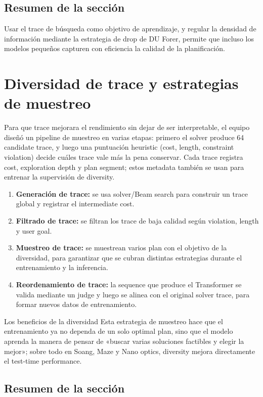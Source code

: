 \documentclass[a4paper]{article}
\begin{document}
\subsection{Resumen de la sección}

Usar el trace de búsqueda como objetivo de aprendizaje, y regular la densidad de información mediante la estrategia de drop de DU Forer, permite que incluso los modelos pequeños capturen con eficiencia la calidad de la planificación.

\section{Diversidad de trace y estrategias de muestreo}

Para que trace mejorara el rendimiento sin dejar de ser interpretable, el equipo diseñó un pipeline de muestreo en varias etapas: primero el solver produce 64 candidate trace, y luego una puntuación heuristic (cost, length, constraint violation) decide cuáles trace vale más la pena conservar. Cada trace registra cost, exploration depth y plan segment; estos metadata también se usan para entrenar la supervisión de diversity.
\begin{enumerate}
    \item \textbf{Generación de trace:} se usa solver/Beam search para construir un trace global y registrar el intermediate cost.
    \item \textbf{Filtrado de trace:} se filtran los trace de baja calidad según violation, length y user goal.
    \item \textbf{Muestreo de trace:} se muestrean varios plan con el objetivo de la diversidad, para garantizar que se cubran distintas estrategias durante el entrenamiento y la inferencia.
    \item \textbf{Reordenamiento de trace:} la sequence que produce el Transformer se valida mediante un judge y luego se alinea con el original solver trace, para formar nuevos datos de entrenamiento.
\end{enumerate}
\begin{knowledgebox}{Los beneficios de la diversidad}
Esta estrategia de muestreo hace que el entrenamiento ya no dependa de un solo optimal plan, sino que el modelo aprenda la manera de pensar de «buscar varias soluciones factibles y elegir la mejor»; sobre todo en Soang, Maze y Nano optics, diversity mejora directamente el test-time performance.
\end{knowledgebox}

\subsection{Resumen de la sección}
\end{document}
